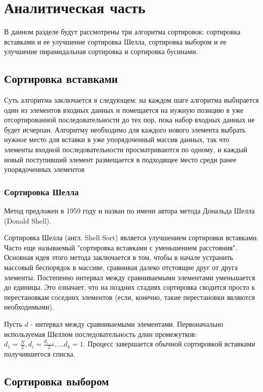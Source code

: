 \chapter{Аналитическая часть}
В данном разделе будут рассмотрены три алгоритма сортировок: сортировка вставками и ее улучшение сортировка Шелла, сортировка выбором и ее улучшение пирамидальная сортировка и сортировка бусинами.
\section{Сортировка вставками}

Суть алгоритма заключается в следующем: на каждом  шаге  алгоритма  выбирается один  из  элементов входных данных и  помещается  на нужную  позицию  в  уже  отсортированной последовательности до тех  пор,  пока  набор  входных  данных  не будет  исчерпан.  Алгоритму  необходимо  для  каждого нового  элемента  выбрать нужное место для вставки в уже упорядоченный массив данных, так что элементы  входной  последовательности просматриваются  по одному,  и каждый новый поступивший элемент размещается  в  подходящее  место среди  ранее  упорядоченных  элементов

\subsection{Сортировка Шелла}

Метод предложен в 1959 году и назван по имени автора метода Дональда Шелла (Donald Shell). 

Сортировка Шелла \cite{book_lipachev, book_sort_algorithms, book_knut} (англ. Shell Sort) является улучшением сортировки вставками. Часто еще называемый "сортировка вставками с уменьшением расстояния". Основная идея этого метода заключается в том, чтобы в начале устранить массовый беспорядок в массиве, сравнивая далеко
отстоящие друг от друга элементы. Постепенно интервал между сравниваемыми элементами уменьшается до единицы. Это означает, что на поздних стадиях сортировка сводится просто к перестановкам соседних элементов (если, конечно, такие перестановки являются необходимыми).

Пусть $d$ - интервал между сравниваемыми элементами. Первоначально используемая Шеллом последовательность длин промежутков: $d_1 = \frac{N}{2}, d_{i} = \frac{d_{i - 1}}{2}, … d_k = 1$. Процесс завершается обычной сортировкой вставками получившегося списка.

\section{Сортировка выбором}


